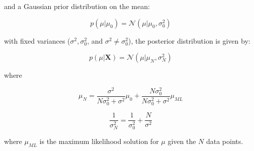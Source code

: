 \documentclass[11pt]{article}
\begin{document}
and a Gaussian prior distribution on the mean:

\begin{equation}
p(\mu|\mu_0) = \mathcal{N}(\mu|\mu_0,\sigma^{2}_{0})
\end{equation}

with fixed variances ($\sigma^2, \sigma^{2}_{0}$, and $\sigma^2 \neq \sigma^{2}_{0}$), the posterior distribution is given by:

\begin{equation}
p(\mu|\mathbf{X}) = \mathcal{N}(\mu|\mu_N,\sigma^{2}_{N})
\end{equation}

where

\begin{equation}
\mu_N = \frac{\sigma^2}{N\sigma^{2}_{0} + \sigma^2}\mu_0 + \frac{N\sigma^{2}_{0}}{N\sigma^{2}_{0} + \sigma^2}\mu_{ML}
\end{equation}

\begin{equation}
\frac{1}{\sigma^{2}_{N}} = \frac{1}{\sigma^{2}_0} + \frac{N}{\sigma^{2}}
\end{equation}

where $\mu_{ML}$ is the maximum likelihood solution for $\mu$ given the $N$ data points.
\end{document}
